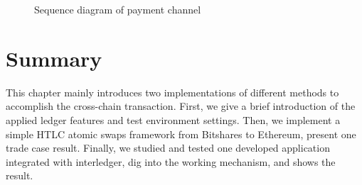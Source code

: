\begin{figure}[H]
      \hfill
      \centering
    \caption{Sequence diagram of payment channel}
    \label{fig:dia}
\end{figure}

\section{Summary}
\label{sec:sum4}
\noindent This chapter mainly introduces two implementations of different methods to accomplish the cross-chain transaction. First, we give a brief introduction of the applied ledger features and test environment settings. Then, we implement a simple HTLC atomic swaps framework from Bitshares to Ethereum, present one trade case result. Finally, we studied and tested one developed application integrated with interledger, dig into the working mechanism, and shows the result.
